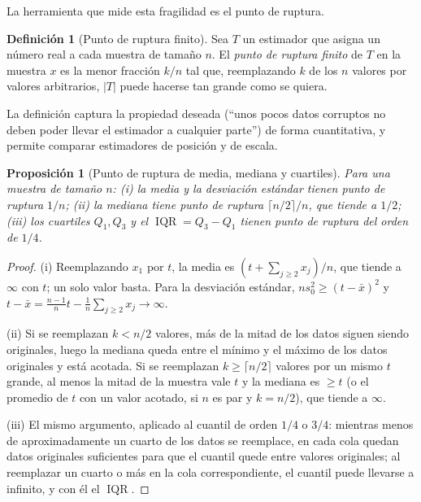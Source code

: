 \documentclass[11pt]{article}
\newtheorem{proposicion}[teorema]{Proposición}
\theoremstyle{definition}
\newtheorem{definicion}[teorema]{Definición}
\theoremstyle{remark}
\DeclareMathOperator{\IQR}{IQR}
\newcommand{\abs}[1]{\left\lvert #1\right\rvert}
\begin{document}
\noindent La herramienta que mide esta fragilidad es el punto de ruptura.

\begin{definicion}[Punto de ruptura finito]\label{def:ruptura}
\noindent Sea $T$ un estimador que asigna un número real a cada muestra de tamaño $n$. El \emph{punto de ruptura finito} de $T$ en la muestra $x$ es la menor fracción $k/n$ tal que, reemplazando $k$ de los $n$ valores por valores arbitrarios, $\abs{T}$ puede hacerse tan grande como se quiera.
\end{definicion}

\noindent La definición captura la propiedad deseada (``unos pocos datos corruptos no deben poder llevar el estimador a cualquier parte'') de forma cuantitativa, y permite comparar estimadores de posición y de escala.

\begin{proposicion}[Punto de ruptura de media, mediana y cuartiles]\label{prop:ruptura}
\noindent Para una muestra de tamaño $n$: (i) la media y la desviación estándar tienen punto de ruptura $1/n$; (ii) la mediana tiene punto de ruptura $\lceil n/2\rceil/n$, que tiende a $1/2$; (iii) los cuartiles $Q_1,Q_3$ y el $\IQR=Q_3-Q_1$ tienen punto de ruptura del orden de $1/4$.
\end{proposicion}
\begin{proof}
\noindent (i) Reemplazando $x_1$ por $t$, la media es $(t+\sum_{j\ge2}x_j)/n$, que tiende a $\infty$ con $t$; un solo valor basta. Para la desviación estándar, $ns_0^2\ge(t-\bar x)^2$ y $t-\bar x=\frac{n-1}{n}t-\frac1n\sum_{j\ge2}x_j\to\infty$.

\medskip

\noindent (ii) Si se reemplazan $k<n/2$ valores, más de la mitad de los datos siguen siendo originales, luego la mediana queda entre el mínimo y el máximo de los datos originales y está acotada. Si se reemplazan $k\ge\lceil n/2\rceil$ valores por un mismo $t$ grande, al menos la mitad de la muestra vale $t$ y la mediana es $\ge t$ (o el promedio de $t$ con un valor acotado, si $n$ es par y $k=n/2$), que tiende a $\infty$.

\medskip

\noindent (iii) El mismo argumento, aplicado al cuantil de orden $1/4$ o $3/4$: mientras menos de aproximadamente un cuarto de los datos se reemplace, en cada cola quedan datos originales suficientes para que el cuantil quede entre valores originales; al reemplazar un cuarto o más en la cola correspondiente, el cuantil puede llevarse a infinito, y con él el $\IQR$.
\end{proof}
\end{document}

